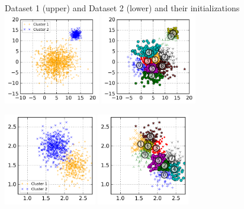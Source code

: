\documentclass{beamer}
\begin{document}
\begin{frame}
  \begin{center}
    Dataset 1 (upper) and Dataset 2 (lower) and their initializations\\
    \includegraphics[height=4cm]{img/exmp_dif_variance_ori.png}
    \includegraphics[height=4cm]{img/exmp_dif_variance_ini.png}
  \end{center}

  \begin{center}
    \includegraphics[height=4cm]{img/exmp_close_ori.png}
    \includegraphics[height=4cm]{img/exmp_close_ini.png}
    \vskip1cm
  \end{center}
\end{frame}
\end{document}
